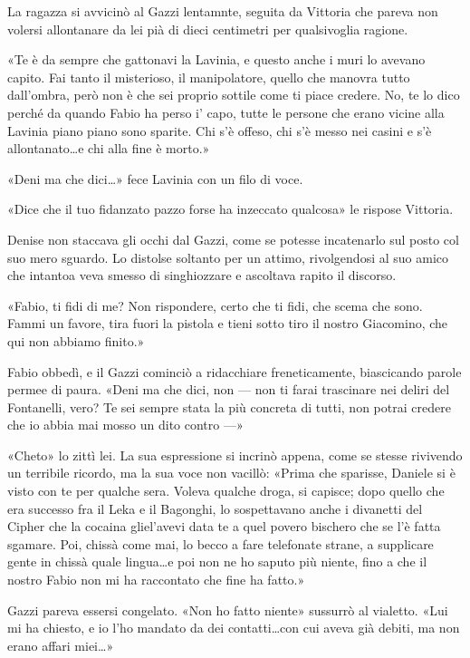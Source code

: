 La ragazza si avvicinò al Gazzi lentamnte, seguita da Vittoria che pareva non volersi allontanare da lei pià di dieci centimetri per qualsivoglia ragione. 

«Te è da sempre che gattonavi la Lavinia, e questo anche i muri lo avevano capito. Fai tanto il misterioso, il manipolatore, quello che manovra tutto dall'ombra, però non è che sei proprio sottile come ti piace credere. No, te lo dico perché da quando Fabio ha perso i' capo, tutte le persone che erano vicine alla Lavinia piano piano sono sparite. Chi s'è offeso, chi s'è messo nei casini e s'è allontanato\ldots e chi alla fine è morto.»

«Deni ma che dici\ldots» fece Lavinia con un filo di voce.

«Dice che il tuo fidanzato pazzo forse ha inzeccato qualcosa» le rispose Vittoria. 

Denise non staccava gli occhi dal Gazzi, come se potesse incatenarlo sul posto col suo mero sguardo. Lo distolse soltanto per un attimo, rivolgendosi al suo amico che intantoa veva smesso di singhiozzare e ascoltava rapito il discorso.

«Fabio, ti fidi di me? Non rispondere, certo che ti fidi, che scema che sono. Fammi un favore, tira fuori la pistola e tieni sotto tiro il nostro Giacomino, che qui non abbiamo finito.»

Fabio obbedì, e il Gazzi cominciò a ridacchiare freneticamente, biascicando parole permee di paura. «Deni ma che dici, non --- non ti farai trascinare nei deliri del Fontanelli, vero? Te sei sempre stata la più concreta di tutti, non potrai credere che io abbia mai mosso un dito contro ---»

«Cheto» lo zittì lei. La sua espressione si incrinò appena, come se stesse rivivendo un terribile ricordo, ma la sua voce non vacillò: «Prima che sparisse, Daniele si è visto con te per qualche sera. Voleva qualche droga, si capisce; dopo quello che era successo fra il Leka e il Bagonghi, lo sospettavano anche i divanetti del Cipher che la cocaina gliel'avevi data te a quel povero bischero che se l'è fatta sgamare. Poi, chissà come mai, lo becco a fare telefonate strane, a supplicare gente in chissà quale lingua\ldots e poi non ne ho saputo più niente, fino a che il nostro Fabio non mi ha raccontato che fine ha fatto.»

Gazzi pareva essersi congelato. «Non ho fatto niente» sussurrò al vialetto. «Lui mi ha chiesto, e io l'ho mandato da dei contatti\ldots con cui aveva già debiti, ma non erano affari miei\ldots»

